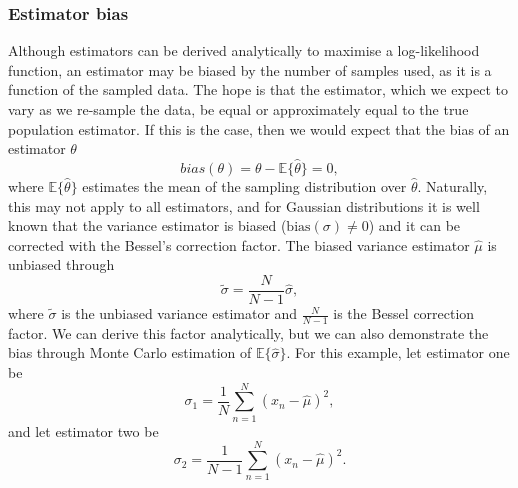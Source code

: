 \documentclass{article}
\begin{document}
 \subsubsection{Estimator bias}
 Although estimators can be derived analytically to maximise a log-likelihood function, an estimator may be biased by the number of samples used, as it is a function of the sampled data. The hope is that the estimator, which we expect to vary as we re-sample the data, be equal or approximately equal to the true population estimator. If this is the case, then we would expect that the bias of an estimator $\theta$
 \begin{equation}
     bias(\theta) = \theta - \mathbb{E}\{ \hat{\theta} \} = 0,
 \end{equation}
 where $\mathbb{E}\{ \hat{\theta} \}$ estimates the mean of the sampling distribution over $\hat{\theta}$. Naturally, this may not apply to all estimators, and for Gaussian distributions it is well known that the variance estimator is biased ($\text{bias}(\sigma) \ne 0$) and it can be corrected with the Bessel's correction factor. The biased variance estimator $\hat{\mu}$ is unbiased through 
 \begin{equation}
    \tilde{\sigma} = \frac{N}{N - 1} \hat{\sigma},
 \end{equation}
 where $\tilde{\sigma}$ is the unbiased variance estimator and $\frac{N}{N - 1}$ is the Bessel correction factor. We can derive this factor analytically, but we can also demonstrate the bias through Monte Carlo estimation of $\mathbb{E}\{\hat{\sigma}\}$. For this example, let estimator one be
 \begin{equation}
    \sigma_1 = \frac{1}{N}\sum_{n=1}^{N} \left( x_n - \hat{\mu} \right)^2,
\end{equation}
and let estimator two be
\begin{equation}
    \sigma_2 = \frac{1}{N - 1}\sum_{n=1}^{N} \left( x_n - \hat{\mu} \right)^2.
\end{equation}
 
\end{document}
